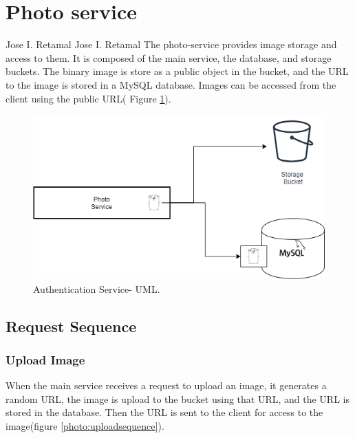 \section{Photo service}{Jose I. Retamal }
Jose I. Retamal
\vskip 0.1in
\indent
\indent
The photo-service provides image storage and access to them. It is composed of the main service, the database, and storage buckets.
The binary image is store as a public object in the bucket, and the URL to the image is stored in a MySQL database. Images can be accessed from the client using the public URL(
Figure \ref{photo:mainuml}). 

\begin{figure}[H]
	\begin{center}
		\includegraphics[width=120mm,scale=1]{img/photos/photos-main-uml.png}
		\caption{Authentication Service- UML.}
		\label{photo:mainuml}
	\end{center}
	
\end{figure}

\subsection{Request Sequence}

\subsubsection{Upload Image}

When the main service receives a request to upload an image, it generates a random URL, the image is upload to the bucket using that URL, and the URL is stored in the database. Then the URL is sent to the client for access to the image(figure \ref{photo:uploadsequence}).

